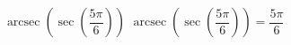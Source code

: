  {$\operatorname{arcsec}\left(\sec\left( \dfrac{5\pi}{6} \right) \right)$}
{ $\operatorname{arcsec}\left(\sec\left( \dfrac{5\pi}{6} \right) \right) = \dfrac{5\pi}{6}$}
